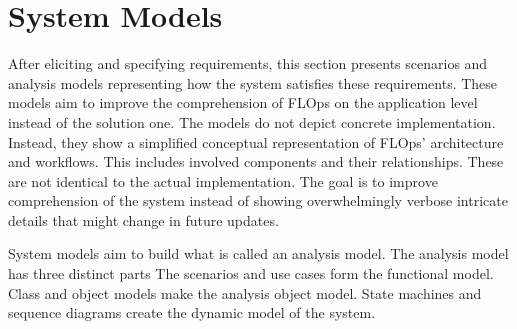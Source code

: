 \section{System Models}

After eliciting and specifying requirements, this section presents scenarios and analysis models representing how the system satisfies these requirements.
These models aim to improve the comprehension of FLOps on the application level instead of the solution one.
The models do not depict concrete implementation.
Instead, they show a simplified conceptual representation of FLOps' architecture and workflows.
This includes involved components and their relationships.
These are not identical to the actual implementation.
The goal is to improve comprehension of the system instead of showing overwhelmingly verbose intricate details that might change in future updates.

System models aim to build what is called an analysis model.
The analysis model has three distinct parts
The scenarios and use cases form the functional model.
Class and object models make the analysis object model.
State machines and sequence diagrams create the dynamic model of the system. \cite{book:bruegge}












